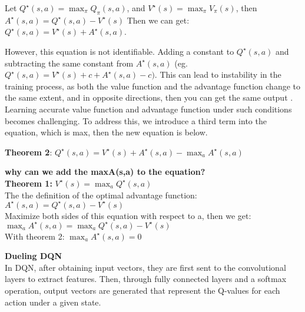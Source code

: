 \documentclass{article}
\begin{document}
Let $Q^{\star}(s, a)=\max _\pi Q_\pi(s, a)$, and $V^{\star}(s)=\max _\pi V_\pi(s)$, then $A^{\star}(s,a) = Q^{\star}(s,a) - V^{\star}(s)$
Then we can get: $Q^{\star}(s,a) = V^{\star}(s) + A^{\star}(s,a)$.

However, this equation is not identifiable. Adding a constant to $Q^{\star}(s,a)$ and subtracting the same constant from $A^{\star}(s,a)$ (eg. $Q^{\star}(s,a) = V^{\star}(s) + c + A^{\star}(s,a) -c )$. This can lead to instability in the training process, as both the value function and the advantage function change to the same extent, and in opposite directions, then you can get the same output . Learning accurate value function and advantage function under such conditions becomes challenging. To address this, we introduce a third term into the equation, which is max, then the new equation is below.

\textbf{Theorem 2}: $Q^{\star}(s,a) = V^{\star}(s) + A^{\star}(s,a) - \max_a A^{\star}(s,a)$

\hspace*{\fill}

\begin{mdframed}[hidealllines=false,backgroundcolor=white!20]
\textbf{why can we add the maxA(s,a) to the equation?}\\

\textbf{Theorem 1:} $V^{\star}(s) = \max_a Q^{\star}(s,a)$\\

The the definition of the optimal advantage function:\\

$A^{\star}(s,a) = Q^{\star}(s,a) - V^{\star}(s)$\\

Maximize both sides of this equation with respect to a, then we get:\\

$\max_a A^{\star}(s,a) = \max_a Q^{\star}(s,a) - V^{\star}(s)$\\

With theorem 2: $\max_a A^{\star}(s,a) = 0$\\
\end{mdframed}

\hspace*{\fill}

\noindent
\textbf{Dueling DQN}\\
\noindent
In DQN, after obtaining input vectors, they are first sent to the convolutional layers to extract features. Then, through fully connected layers and a softmax operation, output vectors are generated that represent the Q-values for each action under a given state.
\end{document}
